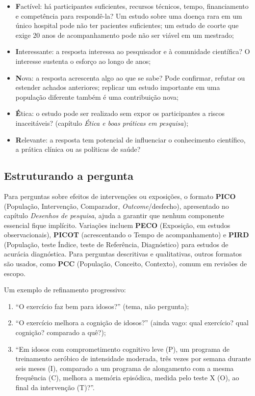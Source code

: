 \documentclass[
]{book}
\providecommand{\tightlist}{%
  \setlength{\itemsep}{0pt}\setlength{\parskip}{0pt}}
\begin{document}
\begin{itemize}
\tightlist
\item
  \textbf{F}actível: há participantes suficientes, recursos técnicos, tempo, financiamento e competência para respondê-la? Um estudo sobre uma doença rara em um único hospital pode não ter pacientes suficientes; um estudo de coorte que exige 20 anos de acompanhamento pode não ser viável em um mestrado;
\item
  \textbf{I}nteressante: a resposta interessa ao pesquisador e à comunidade científica? O interesse sustenta o esforço ao longo de anos;
\item
  \textbf{N}ova: a resposta acrescenta algo ao que se sabe? Pode confirmar, refutar ou estender achados anteriores; replicar um estudo importante em uma população diferente também é uma contribuição nova;
\item
  \textbf{É}tica: o estudo pode ser realizado sem expor os participantes a riscos inaceitáveis? (capítulo \emph{Ética e boas práticas em pesquisa});
\item
  \textbf{R}elevante: a resposta tem potencial de influenciar o conhecimento científico, a prática clínica ou as políticas de saúde?
\end{itemize}

\subsection{Estruturando a pergunta}\label{estruturando-a-pergunta}

Para perguntas sobre efeitos de intervenções ou exposições, o formato \textbf{PICO} (População, Intervenção, Comparador, \emph{Outcome}/desfecho), apresentado no capítulo \emph{Desenhos de pesquisa}, ajuda a garantir que nenhum componente essencial fique implícito. Variações incluem \textbf{PECO} (Exposição, em estudos observacionais), \textbf{PICOT} (acrescentando o Tempo de acompanhamento) e \textbf{PIRD} (População, teste Índice, teste de Referência, Diagnóstico) para estudos de acurácia diagnóstica. Para perguntas descritivas e qualitativas, outros formatos são usados, como \textbf{PCC} (População, Conceito, Contexto), comum em revisões de escopo.

Um exemplo de refinamento progressivo:

\begin{enumerate}
\def\labelenumi{\arabic{enumi}.}
\tightlist
\item
  ``O exercício faz bem para idosos?'' (tema, não pergunta);
\item
  ``O exercício melhora a cognição de idosos?'' (ainda vago: qual exercício? qual cognição? comparado a quê?);
\item
  ``Em idosos com comprometimento cognitivo leve (P), um programa de treinamento aeróbico de intensidade moderada, três vezes por semana durante seis meses (I), comparado a um programa de alongamento com a mesma frequência (C), melhora a memória episódica, medida pelo teste X (O), ao final da intervenção (T)?''.
\end{enumerate}
\end{document}
